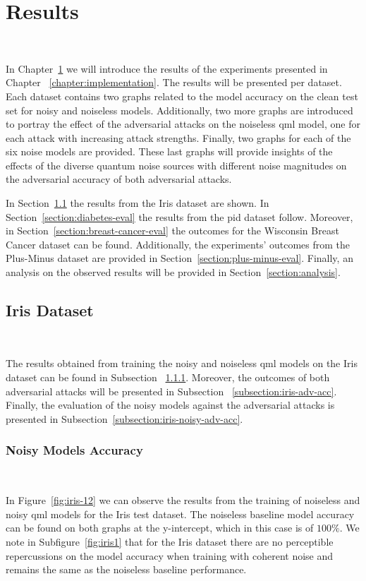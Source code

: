 \chapter{Results}\label{chapter:results} \

In Chapter~\ref{chapter:results} we will introduce
the results of the experiments presented in Chapter
~\ref{chapter:implementation}. The results will be presented
per dataset. Each dataset contains two graphs related to
the model accuracy on the clean test set for noisy and
noiseless models. Additionally, two more graphs are
introduced to portray the effect of the adversarial
attacks on the noiseless \ac{qml} model, one for each
attack with increasing attack strengths. Finally, two
graphs for each of the six noise models are provided.
These last graphs will provide insights of the effects
of the diverse quantum noise sources with different noise 
magnitudes on the adversarial accuracy of both adversarial
attacks. \

In Section~\ref{section:iris-eval} the results from
the Iris dataset are shown. In Section~\ref{section:diabetes-eval}
the results from the \ac{pid} dataset follow. Moreover,
in Section~\ref{section:breast-cancer-eval} the outcomes
for the Wisconsin Breast Cancer dataset can be found.
Additionally, the experiments' outcomes from the Plus-Minus dataset
are provided in Section~\ref{section:plus-minus-eval}.
Finally, an analysis on the observed results will
be provided in Section~\ref{section:analysis}. \

\section{Iris Dataset}\label{section:iris-eval} \

The results obtained from training the noisy and noiseless
\ac{qml} models on the Iris dataset can be found in Subsection
~\ref{subsection:iris-noisy-acc}. Moreover, the outcomes
of both adversarial attacks will be presented in Subsection
~\ref{subsection:iris-adv-acc}. Finally, the evaluation
of the noisy models against the adversarial attacks is
presented in Subsection~\ref{subsection:iris-noisy-adv-acc}. \

\subsection{Noisy Models Accuracy}\label{subsection:iris-noisy-acc} \

In Figure~\ref{fig:iris-12} we can observe the results
from the training of noiseless and noisy \ac{qml} models
for the Iris test dataset. The noiseless baseline model accuracy
can be found on both graphs at the y-intercept, which in
this case is of \(100\%\). We note in Subfigure~\ref{fig:iris1}
that for the Iris dataset there are no perceptible
repercussions on the model accuracy when training with
coherent noise and remains the same as the noiseless
baseline performance. \

